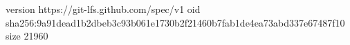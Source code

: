 version https://git-lfs.github.com/spec/v1
oid sha256:9a91dead1b2dbeb3c93b061e1730b2f21460b7fab1de4ea73abd337e67487f10
size 21960
